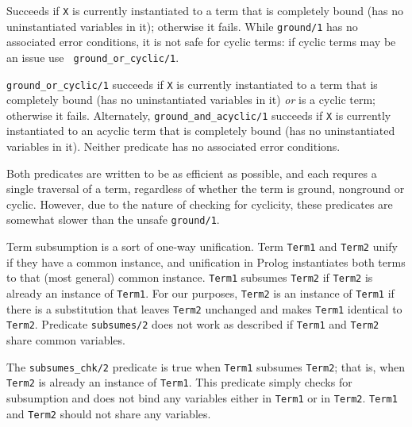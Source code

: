 \begin{description}
%
Succeeds if {\tt X} is currently instantiated to a term that is
completely bound (has no uninstantiated variables in it); otherwise it
fails.  While {\tt ground/1} has no associated error conditions, it is
not safe for cyclic terms: if cyclic terms may be an issue use {\tt
  ground\_or\_cyclic/1}.

%
{\tt ground\_or\_cyclic/1} succeeds if {\tt X} is currently
instantiated to a term that is completely bound (has no uninstantiated
variables in it) {\em or} is a cyclic term; otherwise it fails.
Alternately, {\tt ground\_and\_acyclic/1} succeeds if {\tt X} is
currently instantiated to an acyclic term that is completely bound
(has no uninstantiated variables in it).  Neither predicate has no
associated error conditions.

Both predicates are written to be as efficient as possible, and each
requres a single traversal of a term, regardless of whether the term
is ground, nonground or cyclic.  However, due to the nature of
checking for cyclicity, these predicates are somewhat slower than the
unsafe {\tt ground/1}.

    Term subsumption is a sort of one-way unification.  Term {\tt Term1}
    and {\tt Term2} unify if they have a common instance, and unification
    in Prolog instantiates both terms to that (most general) common instance.
    {\tt Term1} subsumes {\tt Term2} if {\tt Term2} is already an instance of
    {\tt Term1}.  For our purposes, {\tt Term2} is an instance of {\tt Term1}
    if there is a substitution that leaves {\tt Term2} unchanged and makes
    {\tt Term1} identical to {\tt Term2}.  Predicate {\tt subsumes/2} does
    not work as described if {\tt Term1} and {\tt Term2} share common
    variables.

%
%
    The {\tt subsumes\_chk/2} predicate is true when {\tt Term1} subsumes 
    {\tt Term2}; that is, when {\tt Term2} is already an instance of
    {\tt Term1}.  This predicate simply checks for subsumption and 
    does not bind any variables either in {\tt Term1} or in {\tt Term2}.
    {\tt Term1} and {\tt Term2} should not share any variables.


\end{description}
